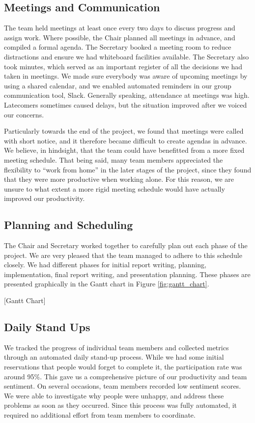 \subsection{Meetings and Communication}
\label{sec:meetings}
The team held meetings at least once every two days to discuss progress and assign work. Where possible, the Chair planned all meetings in advance, and compiled a formal agenda. The Secretary booked a meeting room to reduce distractions and ensure we had whiteboard facilities available. The Secretary also took minutes, which served as an important register of all the decisions we had taken in meetings. We made sure everybody was aware of upcoming meetings by using a shared calendar, and we enabled automated reminders in our group communication tool, Slack. Generally speaking, attendance at meetings was high. Latecomers sometimes caused delays, but the situation improved after we voiced our concerns. 

Particularly towards the end of the project, we found that meetings were called with short notice, and it therefore became difficult to create agendas in advance. We believe, in hindsight, that the team could have benefitted from a more fixed meeting schedule. That being said, many team members appreciated the flexibility to “work from home” in the later stages of the project, since they found that they were more productive when working alone. For this reason, we are unsure to what extent a more rigid meeting schedule would have actually improved our productivity.

\subsection{Planning and Scheduling}
The Chair and Secretary worked together to carefully plan out each phase of the project. We are very pleased that the team managed to adhere to this schedule closely. We had different phases for initial report writing, planning, implementation, final report writing, and presentation planning. These phases are presented graphically in the Gantt chart in Figure \ref{fig:gantt_chart}.

[Gantt Chart]

\subsection{Daily Stand Ups}
\label{sec:standups}
We tracked the progress of individual team members and collected metrics through an automated daily stand-up process. While we had some initial reservations that people would forget to complete it, the participation rate was around 95\%. This gave us a comprehensive picture of our productivity and team sentiment. On several occasions, team members recorded low sentiment scores. We were able to investigate why people were unhappy, and address these problems as soon as they occurred. Since this process was fully automated, it required no additional effort from team members to coordinate. 

